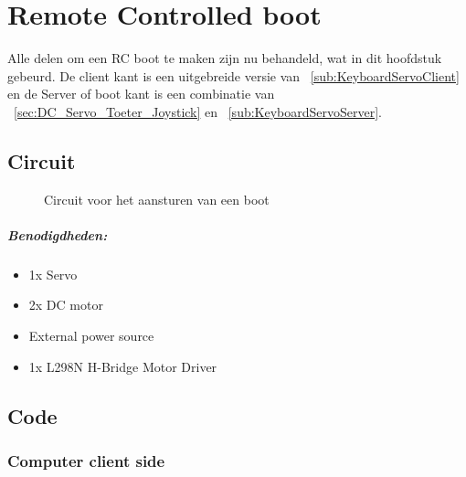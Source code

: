 \chapter{Remote Controlled boot}
Alle delen om een RC boot te maken zijn nu behandeld, wat in dit hoofdstuk gebeurd. De client kant is een uitgebreide versie van ~\ref{sub:KeyboardServoClient} en de Server of boot kant is een combinatie van ~\ref{sec:DC_Servo_Toeter_Joystick} en ~\ref{sub:KeyboardServoServer}.


\section{Circuit}
\begin{figure}[H]
	\caption{Circuit voor het aansturen van een boot}
	\label{fig:RCBoat}
\end{figure}

\newpage

\paragraph{Benodigdheden:}
\begin{itemize}
	\item 1x Servo
	\item 2x DC motor
	\item External power source
	\item 1x L298N H-Bridge Motor Driver
\end{itemize}

\section{Code}
\subsection{Computer client side}

